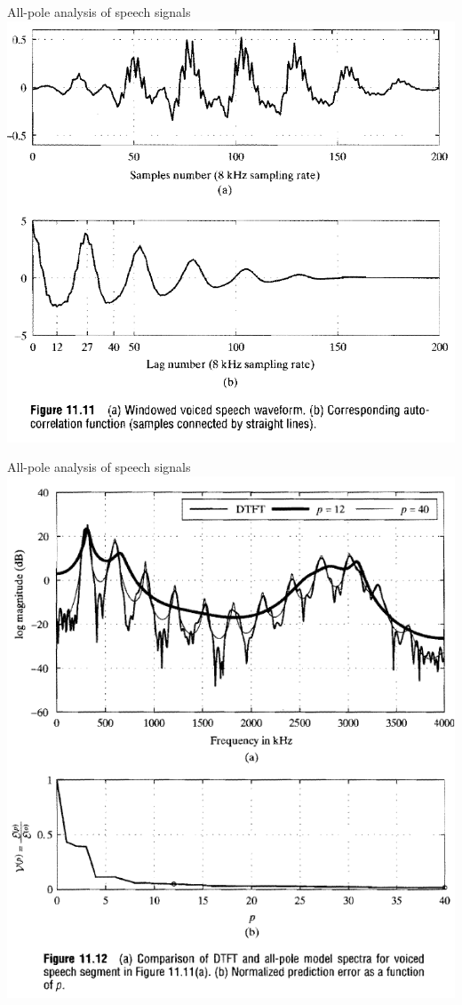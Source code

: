 \documentclass[10pt]{beamer}
\begin{document}
\begin{frame}{All-pole analysis of speech signals}
	\centering
	\includegraphics[scale=0.6]{figs/allpole_model_speech1.png}
\end{frame}


\begin{frame}{All-pole analysis of speech signals}
	\centering
	\includegraphics[scale=0.7]{figs/allpole_model_speech2.png}
\end{frame}
\end{document}
